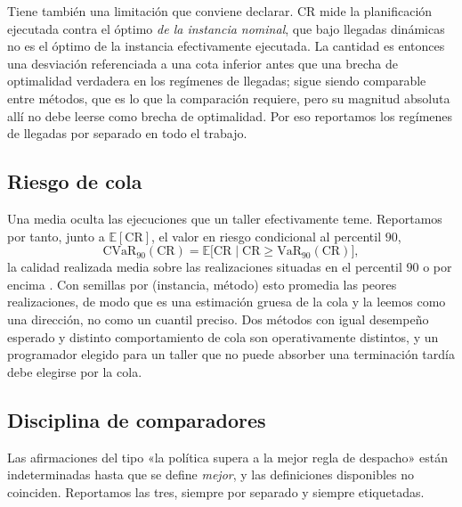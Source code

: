 \documentclass[a4paper,fleqn]{cas-sc}
\newcommand{\RQ}{\mathrm{CR}}
\newcommand{\CVaR}{\mathrm{CVaR}}
\begin{document}
Tiene también una limitación que conviene declarar. $\RQ$ mide la planificación
ejecutada contra el óptimo \emph{de la instancia nominal}, que bajo llegadas
dinámicas no es el óptimo de la instancia efectivamente ejecutada. La cantidad
es entonces una desviación referenciada a una cota inferior antes que una brecha
de optimalidad verdadera en los regímenes de llegadas; sigue siendo comparable
entre métodos, que es lo que la comparación requiere, pero su magnitud absoluta
allí no debe leerse como brecha de optimalidad. Por eso reportamos los regímenes
de llegadas por separado en todo el trabajo.

\subsection{Riesgo de cola}

Una media oculta las ejecuciones que un taller efectivamente teme. Reportamos
por tanto, junto a $\mathbb{E}[\RQ]$, el valor en riesgo condicional al
percentil $90$,
\begin{equation}
  \CVaR_{90}(\RQ)=\mathbb{E}\big[\RQ \mid \RQ \ge \mathrm{VaR}_{90}(\RQ)\big],
\end{equation}
la calidad realizada media sobre las realizaciones situadas en el percentil $90$
o por encima \citep{rockafellar2000,jorion2007}. Con \SeedsPerCell{} semillas
por (instancia, método) esto promedia las \CVaRTail{} peores realizaciones, de
modo que es una estimación gruesa de la cola y la leemos como una dirección, no
como un cuantil preciso. Dos métodos con igual desempeño esperado y
distinto comportamiento de cola son operativamente distintos, y un programador
elegido para un taller que no puede absorber una terminación tardía debe
elegirse por la cola.

\subsection{Disciplina de comparadores}\label{sec:comparators}

Las afirmaciones del tipo «la política supera a la mejor regla de despacho»
están indeterminadas hasta que se define \emph{mejor}, y las definiciones
disponibles no coinciden. Reportamos las tres, siempre por separado y siempre
etiquetadas.
\end{document}
